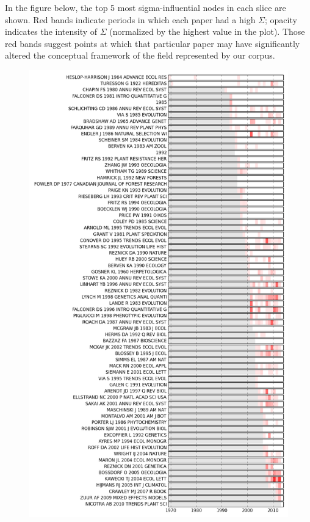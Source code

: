 \documentclass[letterpaper,10pt,english]{sphinxmanual}
\begin{document}
In the figure below, the top 5 most sigma-influential nodes in each slice are shown. Red
bands indicate periods in which each paper had a high \(\Sigma\); opacity indicates
the intensity of \(\Sigma\) (normalized by the highest value in the plot). Those red
bands suggest points at which that particular paper may have significantly altered the
conceptual framework of the field represented by our corpus.
\begin{figure}[htbp]
\centering

\includegraphics{sigma_plot.png}
\end{figure}
\end{document}
